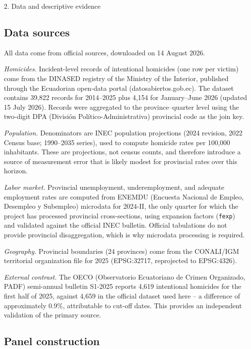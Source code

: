 2. Data and descriptive evidence



\subsection{Data sources}



All data come from official sources, downloaded on 14 August 2026.


\textit{Homicides.} Incident-level records of intentional homicides (one row per victim) come from the DINASED registry of the Ministry of the Interior, published through the Ecuadorian open-data portal (datosabiertos.gob.ec). The dataset contains 39,822 records for 2014--2025 plus 4,154 for January--June 2026 (updated 15 July 2026). Records were aggregated to the province--quarter level using the two-digit DPA (División Político-Administrativa) provincial code as the join key.


\textit{Population.} Denominators are INEC population projections (2024 revision, 2022 Census base; 1990--2035 series), used to compute homicide rates per 100,000 inhabitants. These are projections, not census counts, and therefore introduce a source of measurement error that is likely modest for provincial rates over this horizon.


\textit{Labor market.} Provincial unemployment, underemployment, and adequate employment rates are computed from ENEMDU (Encuesta Nacional de Empleo, Desempleo y Subempleo) microdata for 2024-II, the only quarter for which the project has processed provincial cross-sections, using expansion factors (\texttt{fexp}) and validated against the official INEC bulletin. Official tabulations do not provide provincial disaggregation, which is why microdata processing is required.


\textit{Geography.} Provincial boundaries (24 provinces) come from the CONALI/IGM territorial organization file for 2025 (EPSG:32717, reprojected to EPSG:4326).


\textit{External contrast.} The OECO (Observatorio Ecuatoriano de Crimen Organizado, PADF) semi-annual bulletin S1-2025 reports 4,619 intentional homicides for the first half of 2025, against 4,659 in the official dataset used here -- a difference of approximately 0.9\%, attributable to cut-off dates. This provides an independent validation of the primary source.



\subsection{Panel construction}



